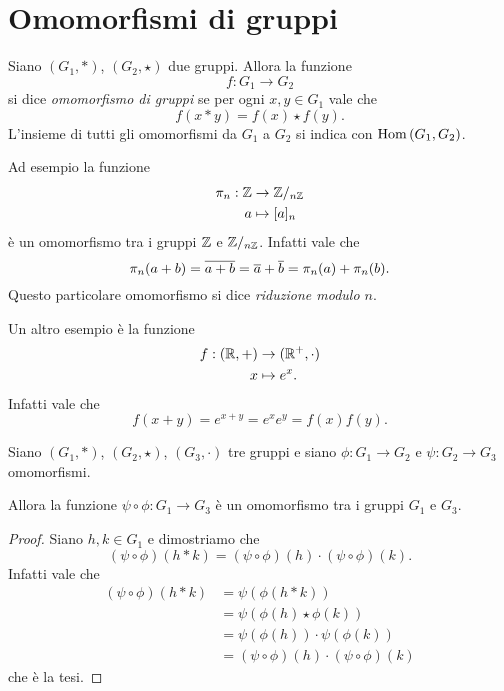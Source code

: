 \section{Omomorfismi di gruppi}

\begin{definition} \label{def:omo_gruppi}
    Siano $(G_1, *)$, $(G_2, \star)$ due gruppi. Allora la funzione \[
        f : G_1 \to G_2    
    \] si dice \emph{omomorfismo di gruppi} se per ogni $x, y \in G_1$ vale che \begin{equation}
        f(x * y) = f(x) \star f(y).
    \end{equation}
    L'insieme di tutti gli omomorfismi da $G_1$ a $G_2$ si indica con $\operatorname{Hom}\left(G_1, G_2\right)$.
\end{definition}

\begin{example}
    Ad esempio la funzione \begin{align*}
    \pi_n : \mathbb{Z} &\to \mathbb{Z}/_{n\mathbb{Z}}\\
    a &\mapsto [a]_n
\end{align*} è un omomorfismo tra i gruppi $\mathbb{Z}$ e $\mathbb{Z}/_{n\mathbb{Z}}$. Infatti vale che \[
    \pi_n(a + b) = \eqcl{a + b} = \eqcl a + \eqcl b = \pi_n(a) + \pi_n(b).
\] Questo particolare omomorfismo si dice \emph{riduzione modulo $n$}.
\end{example}

\begin{example}
    Un altro esempio è la funzione \begin{align*}
    f : (\mathbb{R}, +) &\to (\mathbb{R}^+, {\cdot})\\
    x &\mapsto e^x.
\end{align*} Infatti vale che \[
    f(x + y) = e^{x + y} = e^xe^y = f(x)f(y).    
\]
\end{example}

\begin{proposition}
     \label{prop:comp_omo}
    Siano $(G_1, *)$, $(G_2, \star)$, $(G_3, \cdot)$ tre gruppi e siano $\phi : G_1 \to G_2$ e $\psi : G_2 \to G_3$ omomorfismi.

    Allora la funzione $\psi \circ \phi : G_1 \to G_3$ è un omomorfismo tra i gruppi $G_1$ e $G_3$.
\end{proposition}
\begin{proof}
    Siano $h, k \in G_1$ e dimostriamo che \[
        (\psi \circ \phi)(h * k) = (\psi \circ \phi)(h) \cdot (\psi \circ \phi)(k).
    \] Infatti vale che
    \begin{align*}
        (\psi \circ \phi)(h * k) &= \psi(\phi(h * k)) \tag{$\phi$ omo.}\\
        &= \psi(\phi(h) \star \phi(k)) \tag{$\psi$ omo.}\\
        &= \psi(\phi(h)) \cdot \psi(\phi(k)) \\
        &= (\psi \circ \phi)(h) \cdot (\psi \circ \phi)(k)
    \end{align*}
    che è la tesi.
\end{proof}

